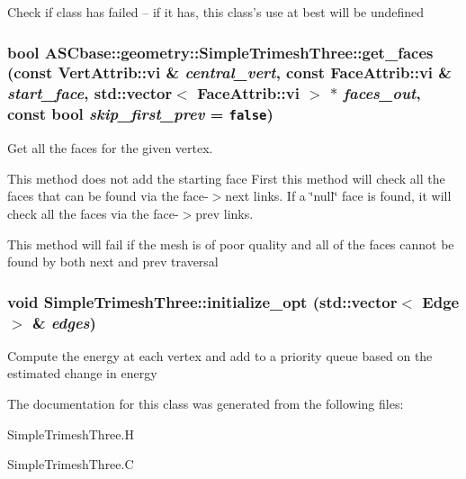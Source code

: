 Check if class has failed -- if it has, this class's use at best will be undefined 
\subsubsection{\setlength{\rightskip}{0pt plus 5cm}bool ASCbase::geometry::Simple\-Trimesh\-Three::get\_\-faces (const \bf{Vert\-Attrib::vi} \& {\em central\_\-vert}, const \bf{Face\-Attrib::vi} \& {\em start\_\-face}, std::vector$<$ \bf{Face\-Attrib::vi} $>$ $\ast$ {\em faces\_\-out}, const bool {\em skip\_\-first\_\-prev} = {\tt false})\hspace{0.3cm}{\tt  [inline, private]}}\label{classASCbase_1_1geometry_1_1SimpleTrimeshThree_f9a5290c66ae41e3683ca5a6c25ef0da}


Get all the faces for the given vertex. 

This method does not add the starting face First this method will check all the faces that can be found via the face-$>$next links. If a \char`\"{}null\char`\"{} face is found, it will check all the faces via the face-$>$prev links.

This method will fail if the mesh is of poor quality and all of the faces cannot be found by both next and prev traversal 
\subsubsection{\setlength{\rightskip}{0pt plus 5cm}void Simple\-Trimesh\-Three::initialize\_\-opt (std::vector$<$ Edge $>$ \& {\em edges})}\label{classASCbase_1_1geometry_1_1SimpleTrimeshThree_788fe4d23d6d07ffc06b1d2bbd2128d2}


Compute the energy at each vertex and add to a priority queue based on the estimated change in energy 

The documentation for this class was generated from the following files:\begin{CompactItemize}
\item 
Simple\-Trimesh\-Three.H\item 
Simple\-Trimesh\-Three.C\end{CompactItemize}
